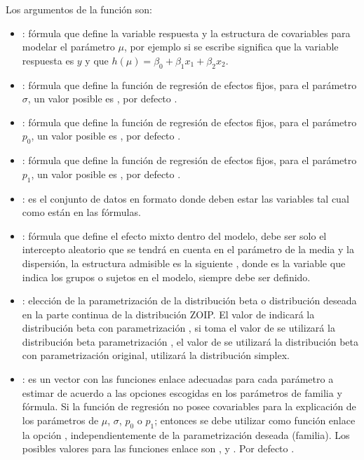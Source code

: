 Los argumentos de la funci\'{o}n  son:


\begin{itemize}[noitemsep, nolistsep]

\item {}: f\'{o}rmula que define la variable respuesta y la estructura de covariables para modelar el par\'{a}metro $\mu$, por ejemplo si se escribe  significa que la variable respuesta es $y$ y que $h(\mu)=\beta_0 + \beta_1 x_1 + \beta_2 x_2$.
\item {}: f\'{o}rmula que define la funci\'{o}n de regresi\'{o}n de efectos fijos, para el par\'{a}metro $\sigma$, un valor posible es , por defecto .
\item {}: f\'{o}rmula que define la funci\'{o}n de regresi\'{o}n de efectos fijos, para el par\'{a}metro $p_0$, un valor posible es , por defecto .
\item {}: f\'{o}rmula que define la funci\'{o}n de regresi\'{o}n de efectos fijos, para el par\'{a}metro $p_1$, un valor posible es , por defecto .
\item {}: es el conjunto de datos en formato  donde deben estar las variables tal cual como est\'{a}n en las f\'{o}rmulas.
\item {}: f\'{o}rmula que define el efecto mixto dentro del modelo, debe ser solo el intercepto aleatorio que se tendr\'{a} en cuenta en el par\'{a}metro de la media y la dispersi\'{o}n, la estructura admisible es la siguiente , donde  es la variable que indica los grupos o sujetos en el modelo, siempre debe ser definido.
\item {}: elecci\'{o}n de la parametrizaci\'{o}n de la distribuci\'{o}n beta o distribuci\'{o}n deseada en la parte continua de la distribuci\'{o}n ZOIP. El valor de  indicar\'{a} la distribuci\'{o}n beta con parametrizaci\'{o}n \cite{Stasinopoulos2}, si toma el valor de  se utilizar\'{a} la distribuci\'{o}n beta parametrizaci\'{o}n \cite{Ferrari2}, el valor de  se utilizar\'{a} la distribuci\'{o}n beta con parametrizaci\'{o}n original,  utilizar\'{a} la distribuci\'{o}n simplex.
\item {}: es un vector con las funciones enlace adecuadas para cada par\'{a}metro a estimar de acuerdo a las opciones escogidas en los par\'{a}metros de familia y f\'{o}rmula. Si la funci\'{o}n de regresi\'{o}n no posee covariables para la explicaci\'{o}n de los par\'{a}metros de $\mu$, $\sigma$, $p_0$ o $p_1$; entonces se debe utilizar como funci\'{o}n enlace la opci\'{o}n , independientemente de la parametrizaci\'{o}n deseada (familia). Los posibles valores para las funciones enlace son ,  y . Por defecto .

\end{itemize}
